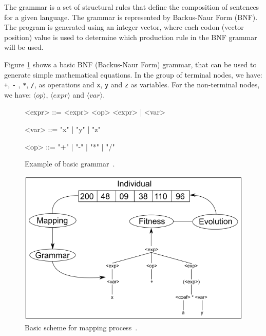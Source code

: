 \documentclass[conference]{IEEEtran}
\begin{document}
	
	The grammar is a set of structural rules that define the composition of sentences for a given language. The grammar is represented by Backus-Naur Form (BNF). The program is generated using an integer vector, where each codon (vector position) value is used to determine which production rule in the BNF grammar will be used.
	
	
	Figure \ref{gr:basic_grammar} shows a basic BNF (Backus-Naur Form) grammar, that can be used to generate simple mathematical equations. In the group of terminal nodes, we have:  \texttt{ +}, \texttt{-} , \texttt{*}, \texttt{/},   as operations and \texttt{x}, \texttt{y} and  \texttt{z}   as variables. For the non-terminal nodes, we have:  $\langle op \rangle$, $\langle expr \rangle$  and $\langle var \rangle$. 
	
	
	
	
	\begin{figure}[!htb]
		\begin{center}
			\begin{grammar}
				<expr> ::= <expr> <op> <expr> | <var> 
				
				<var>  ::= "x" | "y" | "z"
				
				<op>   ::=  "+" | "-" | "*" | "/" 
			\end{grammar}
			\caption{Example of basic grammar~\cite{ryan1998grammatical}.}
			\label{gr:basic_grammar}
		\end{center}
	\end{figure}
	
	
	\begin{figure}[!htb]
		\centering
		\includegraphics[scale=.4]{figures/ge_algo.png}
		\caption{Basic scheme for mapping process~\cite{cerri2013grammatical}.}
		\label{fig:ge_algo}
	\end{figure}
	
\end{document}
